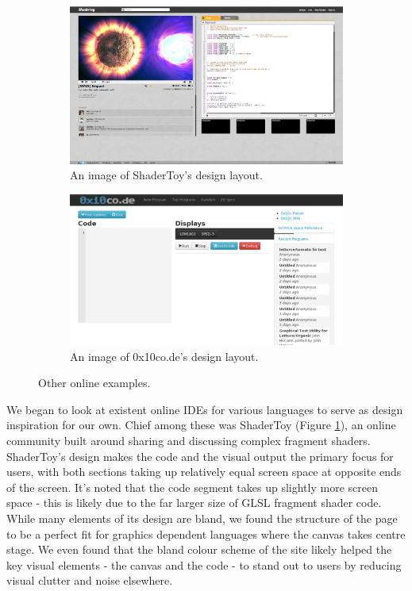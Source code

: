 \documentclass{l3proj}
\begin{document}
\begin{figure}
\centering
\begin{subfigure}[b]{0.45\textwidth}
\includegraphics[width=\textwidth]{images/shadertoy-ide}
\caption{An image of ShaderToy's design layout.}
\label{fig:ide-shadertoy}
\end{subfigure}
\begin{subfigure}[b]{0.45\textwidth}
\includegraphics[width=\textwidth]{images/0x10code}
\caption{An image of 0x10co.de's design layout.}
\label{fig:ide-0x10code}
\end{subfigure}
\caption{Other online examples.}
\label{fig-ide-other}
\end{figure}

We began to look at existent online IDEs for various languages to serve as design inspiration for our own. Chief among these was ShaderToy (Figure \ref{fig:ide-shadertoy}), an online community built around sharing and discussing complex fragment shaders. ShaderToy's design makes the code and the visual output the primary focus for users, with both sections taking up relatively equal screen space at opposite ends of the screen. It's noted that the code segment takes up slightly more screen space - this is likely due to the far larger size of GLSL fragment shader code. While many elements of its design are bland, we found the structure of the page to be a perfect fit for graphics dependent languages where the canvas takes centre stage. We even found that the bland colour scheme of the site likely helped the key visual elements - the canvas and the code - to stand out to users by reducing visual clutter and noise elsewhere.
\end{document}
